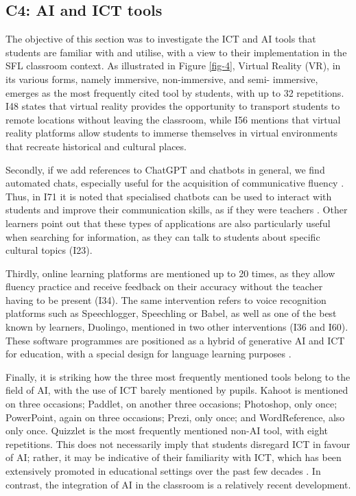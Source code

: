 \documentclass[english]{textolivre}
\begin{document}
\subsection{C4: AI and ICT tools}
The objective of this section was to investigate the ICT and AI tools that students are familiar with and utilise, with a view to their implementation in the SFL classroom context. As illustrated in Figure \ref{fig-4}, Virtual Reality (VR), in its various forms, namely immersive, non-immersive, and semi- immersive, emerges as the most frequently cited tool by students, with up to 32 repetitions. I48 states that virtual reality provides the opportunity to transport students to remote locations without leaving the classroom, while I56 mentions that virtual reality platforms allow students to immerse themselves in virtual environments that recreate historical and cultural places.

Secondly, if we add references to ChatGPT and chatbots in general, we find automated chats, especially useful for the acquisition of communicative fluency \cite{guano2023, lucana2023, de-almeida-ferreira2024}. Thus, in I71 it is noted that specialised chatbots can be used to interact with students and improve their communication skills, as if they were teachers \cite{moreno-padilla2019}. Other learners point out that these types of applications are also particularly useful when searching for information, as they can talk to students about specific cultural topics (I23).

Thirdly, online learning platforms are mentioned up to 20 times, as they allow fluency practice and receive feedback on their accuracy without the teacher having to be present (I34). The same intervention refers to voice recognition platforms such as Speechlogger, Speechling or Babel, as well as one of the best known by learners, Duolingo, mentioned in two other interventions (I36 and I60). These software programmes are positioned as a hybrid of generative AI and ICT for education, with a special design for language learning purposes \cite{coello-munoz2023}.

Finally, it is striking how the three most frequently mentioned tools belong to the field of AI, with the use of ICT barely mentioned by pupils. Kahoot is mentioned on three occasions; Paddlet, on another three occasions; Photoshop, only once; PowerPoint, again on three occasions; Prezi, only once; and WordReference, also only once. Quizzlet is the most frequently mentioned non-AI tool, with eight repetitions. This does not necessarily imply that students disregard ICT in favour of AI; rather, it may be indicative of their familiarity with ICT, which has been extensively promoted in educational settings over the past few decades \cite{balart2018tic}. In contrast, the integration of AI in the classroom is a relatively recent development.
\end{document}
